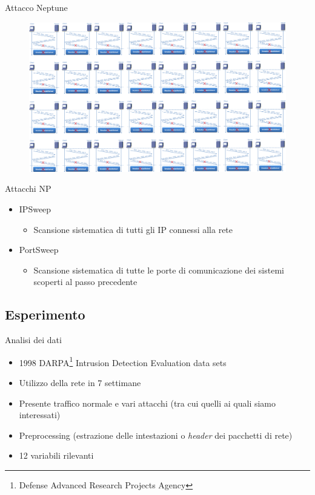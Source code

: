 \documentclass[xcolor={dvipsnames}]{beamer}
\begin{document}
		\begin{frame}{Attacco Neptune}
			\begin{figure}
				\begin{center}
					\includegraphics[width=.9\textwidth]{3wayh8}
				\end{center}
			\end{figure}
		\end{frame}

		\begin{frame}{Attacchi NP}
			\begin{itemize}
				\item IPSweep
				\begin{itemize}
					\item Scansione sistematica di tutti gli IP connessi alla rete
				\end{itemize}
				\item PortSweep
				\begin{itemize}
					\item Scansione sistematica di tutte le porte di comunicazione dei sistemi scoperti al passo precedente
				\end{itemize}
			\end{itemize}
		\end{frame}

	\subsection{Esperimento}

		\begin{frame}{Analisi dei dati}
			\begin{itemize}
				\item 1998 DARPA\footnote[frame]{Defense Advanced Research Projects Agency} Intrusion Detection Evaluation data sets
				\item Utilizzo della rete in 7 settimane
				\item Presente traffico normale e vari attacchi (tra cui quelli ai quali siamo interessati)
				\item Preprocessing (estrazione delle intestazioni o \emph{header} dei pacchetti di rete)
				\item 12 variabili rilevanti
			\end{itemize}				
		\end{frame}
		
\end{document}
